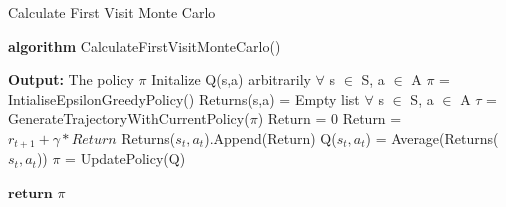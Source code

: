 \documentclass[11pt,twoside,a4paper]{article}
\begin{document}
\begin{algorithm}
\caption{Calculate First Visit Monte Carlo}
\textbf{algorithm} CalculateFirstVisitMonteCarlo()
\begin{algorithmic}[1]
\Statex \textbf{Output:} The policy $\pi$
\Statex
\State Initalize Q(s,a) arbitrarily $\forall$ s $\in$ S, a $\in$ A
\State $\pi$ = IntialiseEpsilonGreedyPolicy()
\State Returns(s,a) = Empty list $\forall$ s $\in$ S, a $\in$ A
\State $\tau$ = GenerateTrajectoryWithCurrentPolicy($\pi$)
\State Return = 0
\State Return = $r_{t+1} + \gamma * Return$
\State Returns($s_t,a_t$).Append(Return)
\State Q($s_t,a_t$) = Average(Returns($s_t,a_t$))
\State $\pi$ = UpdatePolicy(Q)
\EndIf 
\EndFor
\EndWhile

\State $\textbf{return}$ $\pi$
\end{algorithmic}
\end{algorithm}
\end{document}
